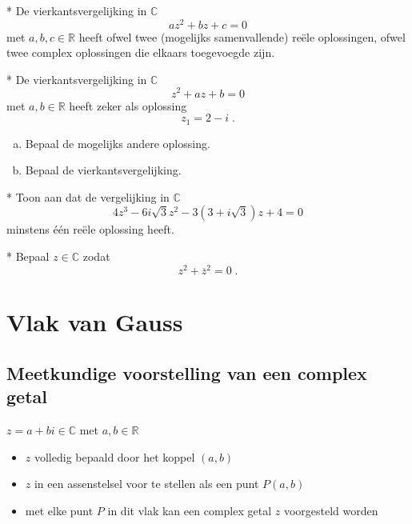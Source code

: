 \documentclass[12pt,twoside,a4paper]{article}
\begin{document}
\begin{oefening}*
De vierkantsvergelijking in $\mathbb{C}$
\[az^2+bz+c=0\]
met $a, b, c \in\mathbb{R}$ heeft ofwel twee (mogelijks samenvallende) reële oplossingen, ofwel twee complex oplossingen die elkaars toegevoegde zijn.
\end{oefening}

\begin{oefening}*
De vierkantsvergelijking in $\mathbb{C}$
\[z^2 + az + b = 0\]
met $a, b \in \mathbb{R}$ heeft zeker als oplossing
\[ z_1=2-i\;. \]
\begin{enumerate}[(a)]
  \item Bepaal de mogelijks andere oplossing.
  \item Bepaal de vierkantsvergelijking.
\end{enumerate}
\end{oefening}

\begin{oefening}*
Toon aan dat de vergelijking in $\mathbb{C}$
\[4z^3-6i\sqrt{3}z^2-3(3+i\sqrt{3})z+4=0\]
minstens één reële oplossing heeft.
\end{oefening}

\begin{oefening}*
Bepaal $z\in\mathbb{C}$ zodat
\[z^2+\overline{z}^2=0\;.\]
\end{oefening}

\cleardoublepage
\section{Vlak van Gauss}

\subsection{Meetkundige voorstelling van een complex getal}

$z=a+bi\in\mathbb{C}$ met $a,b\in\mathbb{R}$
\begin{itemize}
  \renewcommand{\labelitemi}{$\Rightarrow$}
  \item $z$ volledig bepaald door het koppel $(a,b)$
  \item $z$ in een assenstelsel voor te stellen als een punt $P(a,b)$
  \item met elke punt $P$ in dit vlak kan een complex getal $z$ voorgesteld worden
\end{itemize}
\end{document}
